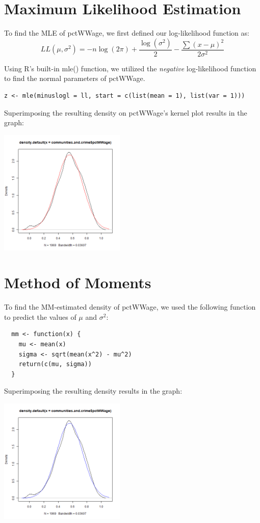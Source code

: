 \documentclass[12pt, letterpaper]{report}
\begin{document}
\pagebreak
\section{Maximum Likelihood Estimation}
To find the MLE of pctWWage, we first defined our log-likelihood function as:
\begin{equation}
  LL(\mu, \sigma^2) = -n \log{(2\pi)} + \frac{\log{(\sigma^2)}}{2} - \frac{\sum(x-\mu)^2}{2\sigma^2}
\end{equation}

Using R's built-in mle() function, we utilized the \textit{negative} log-likelihood function to find the normal parameters of pctWWage.
\begin{lstlisting}
z <- mle(minuslogl = ll, start = c(list(mean = 1), list(var = 1)))
\end{lstlisting} 

Superimposing the resulting density on pctWWage's kernel plot results in the graph:
\begin{center}
\includegraphics[width=0.45\textwidth]{normal/pctWWage_mle}
\end{center}

\pagebreak
\section{Method of Moments}
To find the MM-estimated density of pctWWage, we used the following function to predict the values of $\mu$ and $\sigma^2$:
\begin{lstlisting}
  mm <- function(x) {
    mu <- mean(x)
    sigma <- sqrt(mean(x^2) - mu^2)
    return(c(mu, sigma))
  }  
\end{lstlisting} 

Superimposing the resulting density results in the graph:
\begin{center}
\includegraphics[width=0.45\textwidth]{normal/pctWWage_mm}
\end{center}
\end{document}
